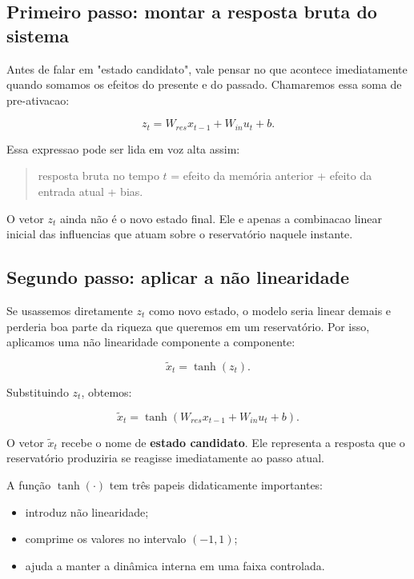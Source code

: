 \documentclass[12pt]{article}
\providecommand{\tightlist}{%
  \setlength{\itemsep}{0pt}\setlength{\parskip}{0pt}}
\begin{document}
\subsection{Primeiro passo: montar a resposta bruta do sistema}\label{33-primeiro-passo-montar-a-resposta-bruta-do-sistema}

Antes de falar em "estado candidato", vale pensar no que acontece imediatamente quando somamos os efeitos do presente e do passado. Chamaremos essa soma de pre-ativacao:

\[
z_t = W_{res} x_{t-1} + W_{in} u_t + b.
\]

Essa expressao pode ser lida em voz alta assim:

\begin{quote}
resposta bruta no tempo \(t\) = efeito da memória anterior + efeito da entrada atual + bias.
\end{quote}

O vetor \(z_t\) ainda não é o novo estado final. Ele e apenas a combinacao linear inicial das influencias que atuam sobre o reservatório naquele instante.

\subsection{Segundo passo: aplicar a não linearidade}\label{34-segundo-passo-aplicar-a-nuxe3o-linearidade}

Se usassemos diretamente \(z_t\) como novo estado, o modelo seria linear demais e perderia boa parte da riqueza que queremos em um reservatório. Por isso, aplicamos uma não linearidade componente a componente:

\[
\widetilde{x}_t = \tanh(z_t).
\]

Substituindo \(z_t\), obtemos:

\[
\widetilde{x}_t = \tanh(W_{res} x_{t-1} + W_{in} u_t + b).
\]

O vetor \(\widetilde{x}_t\) recebe o nome de \textbf{estado candidato}. Ele representa a resposta que o reservatório produziria se reagisse imediatamente ao passo atual.

A função \(\tanh(\cdot)\) tem três papeis didaticamente importantes:

\begin{itemize}
\tightlist
\item
  introduz não linearidade;
\item
  comprime os valores no intervalo \((-1,1)\);
\item
  ajuda a manter a dinâmica interna em uma faixa controlada.
\end{itemize}
\end{document}
